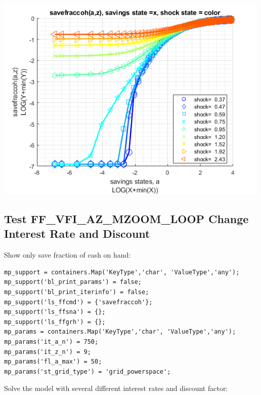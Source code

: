 \documentclass[
]{book}
\begin{document}
\includegraphics[width=5.20833in,height=\textheight]{img/fx_vfi_az_mzoom_loop_images/figure_3.png}

\hypertarget{test-ff_vfi_az_mzoom_loop-change-interest-rate-and-discount}{%
\subsection{Test FF\_VFI\_AZ\_MZOOM\_LOOP Change Interest Rate and Discount}\label{test-ff_vfi_az_mzoom_loop-change-interest-rate-and-discount}}

Show only save fraction of cash on hand:

\begin{verbatim}
mp_support = containers.Map('KeyType','char', 'ValueType','any');
mp_support('bl_print_params') = false;
mp_support('bl_print_iterinfo') = false;
mp_support('ls_ffcmd') = {'savefraccoh'};
mp_support('ls_ffsna') = {};
mp_support('ls_ffgrh') = {};
mp_params = containers.Map('KeyType','char', 'ValueType','any');
mp_params('it_a_n') = 750;
mp_params('it_z_n') = 9;
mp_params('fl_a_max') = 50;
mp_params('st_grid_type') = 'grid_powerspace';
\end{verbatim}

Solve the model with several different interest rates and discount
factor:
\end{document}
